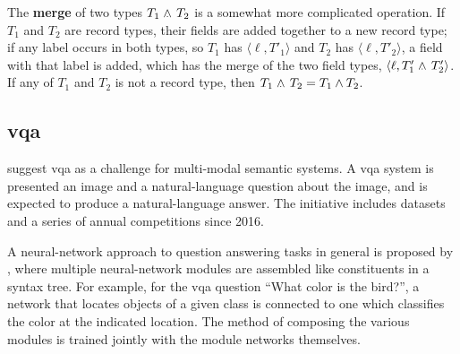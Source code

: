 The \textbf{merge} of two types $T_1 \mathrel{\wedge_{\mkern-10mu\cdot\mkern6mu}} T_2$ is a somewhat more complicated operation.
If $T_1$ and $T_2$ are record types, their fields are added together to a new record type;
if any label occurs in both types, so $T_1$ has $\langle \ell, T'_1\rangle$ and $T_2$ has $\langle \ell, T'_2\rangle$, a field with that label is added, which has the merge of the two field types, $\langle \ell, T'_1 \mathrel{\wedge_{\mkern-10mu\cdot\mkern6mu}} T'_2\rangle$.
If any of $T_1$ and $T_2$ is not a record type, then $T_1 \mathrel{\wedge_{\mkern-10mu\cdot\mkern6mu}} T_2 = T_1 \wedge T_2$.



\subsection{\Acrfull{vqa}}

\cite{AgrawalVQAVisualQuestion2015} suggest \gls{vqa} as a challenge for multi-modal semantic systems.
A \gls{vqa} system is presented an image and a natural-language question about the image, and is expected to produce a natural-language answer.
The initiative includes datasets and a series of annual competitions since 2016.

A neural-network approach to question answering tasks in general is proposed by \cite{AndreasLearningComposeNeural2016}, where multiple neural-network modules are assembled like constituents in a syntax tree.
For example, for the \gls{vqa} question ``What color is the bird?'', a network that locates objects of a given class is connected to one which classifies the color at the indicated location.
The method of composing the various modules is trained jointly with the module networks themselves.


